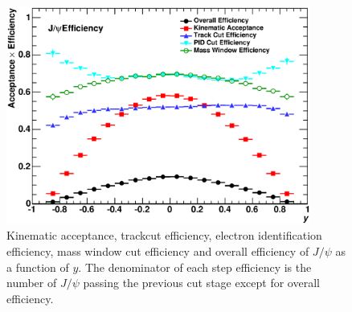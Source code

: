 \begin{figure}[!h]
  \centering
  \includegraphics[width=10cm]{chap4/figure/Correction/JpsiEff_y_stepbystep_bin2.eps}
  \caption{Kinematic acceptance, trackcut efficiency, electron identification efficiency, mass window cut efficiency and overall efficiency of $J/\psi$ as a function of $y$. The denominator of each step efficiency is the number of $J/\psi$ passing the previous cut stage except for overall efficiency.}
  \label{fig_4_jpsieff_y}
\end{figure}

